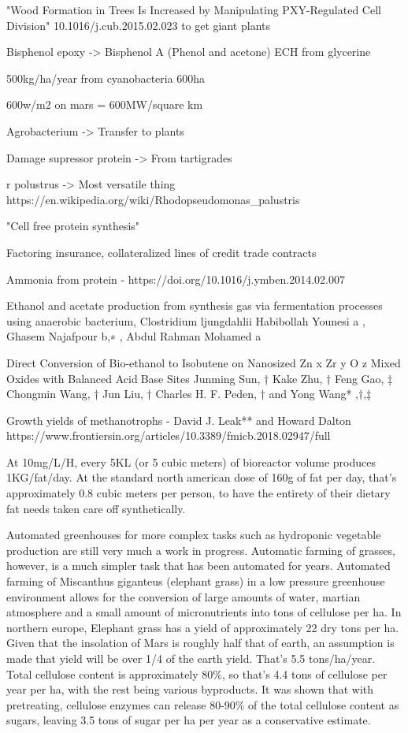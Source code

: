\documentclass[10pt]{article}
\begin{document}
"Wood Formation in Trees Is Increased by Manipulating PXY-Regulated Cell Division" 10.1016/j.cub.2015.02.023 to get giant plants

Bisphenol epoxy ->
Bisphenol A (Phenol and acetone)
ECH from glycerine

500kg/ha/year from cyanobacteria
600ha

600w/m2 on mars = 600MW/square km

Agrobacterium -> Transfer to plants

Damage supressor protein -> From tartigrades

r polustrus -> Most versatile thing https://en.wikipedia.org/wiki/Rhodopseudomonas_palustris

"Cell free protein synthesis"


Factoring insurance, collateralized lines of credit trade contracts

Ammonia from protein - https://doi.org/10.1016/j.ymben.2014.02.007


Ethanol and acetate production from synthesis gas via fermentation
processes using anaerobic bacterium, Clostridium ljungdahlii
Habibollah Younesi a , Ghasem Najafpour b,∗ , Abdul Rahman Mohamed a

Direct Conversion of Bio-ethanol to Isobutene on Nanosized Zn x Zr y O z
Mixed Oxides with Balanced AcidBase Sites
Junming Sun, † Kake Zhu, † Feng Gao, ‡ Chongmin Wang, † Jun Liu, † Charles H. F. Peden, † and Yong Wang* ,†,‡



Growth yields of methanotrophs - David J. Leak** and  Howard Dalton 
https://www.frontiersin.org/articles/10.3389/fmicb.2018.02947/full

At 10mg/L/H, every 5KL (or 5 cubic meters) of bioreactor volume produces 1KG/fat/day. At the standard north american dose of 160g of fat per day, that's approximately 0.8 cubic meters per person, to have the entirety of their dietary fat needs taken care off synthetically.

Automated greenhouses for more complex tasks such as hydroponic vegetable production are still very much a work in progress. Automatic farming of grasses, however, is a much simpler task that has been automated for years. Automated farming of Miscanthus giganteus (elephant grass) in a low pressure greenhouse environment allows for the conversion of large amounts of water, martian atmosphere and a small amount of micronutrients into tons of cellulose per ha. In northern europe, Elephant grass has a yield of approximately 22 dry tons per ha. Given that the insolation of Mars is roughly half that of earth, an assumption is made that yield will be over 1/4 of the earth yield. That's 5.5 tons/ha/year. Total cellulose content is approximately 80\%, so that's 4.4 tons of cellulose per year per ha, with the rest being various byproducts. It was shown that with pretreating, cellulose enzymes can release 80-90\% of the total cellulose content as sugars, leaving 3.5 tons of sugar per ha per year as a conservative estimate.
\end{document}
